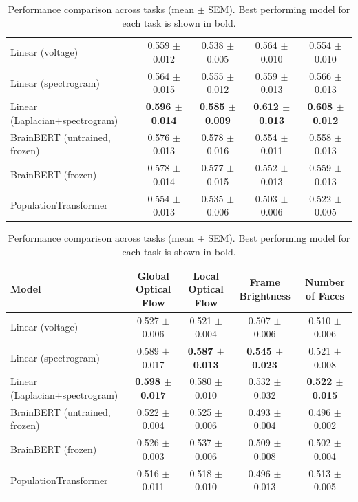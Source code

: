 \begin{table}[h]
\begin{tabular}{lcccc}
\hline
Linear (voltage) & 0.559 $\pm$ 0.012 & 0.538 $\pm$ 0.005 & 0.564 $\pm$ 0.010 & 0.554 $\pm$ 0.010 \\
Linear (spectrogram) & 0.564 $\pm$ 0.015 & 0.555 $\pm$ 0.012 & 0.559 $\pm$ 0.013 & 0.566 $\pm$ 0.013 \\
Linear (Laplacian+spectrogram) & \textbf{0.596 $\pm$ 0.014} & \textbf{0.585 $\pm$ 0.009} & \textbf{0.612 $\pm$ 0.013} & \textbf{0.608 $\pm$ 0.012} \\
BrainBERT (untrained, frozen) & 0.576 $\pm$ 0.013 & 0.578 $\pm$ 0.016 & 0.554 $\pm$ 0.011 & 0.558 $\pm$ 0.013 \\
BrainBERT (frozen) & 0.578 $\pm$ 0.014 & 0.577 $\pm$ 0.015 & 0.552 $\pm$ 0.013 & 0.559 $\pm$ 0.013 \\
PopulationTransformer & 0.554 $\pm$ 0.013 & 0.535 $\pm$ 0.006 & 0.503 $\pm$ 0.006 & 0.522 $\pm$ 0.005 \\
\hline
\end{tabular}
\hspace{1em}
\begin{tabular}{lcccc}
\hline
Model & Global Optical Flow & Local Optical Flow & Frame Brightness & Number of Faces \\
\hline
Linear (voltage) & 0.527 $\pm$ 0.006 & 0.521 $\pm$ 0.004 & 0.507 $\pm$ 0.006 & 0.510 $\pm$ 0.006 \\
Linear (spectrogram) & 0.589 $\pm$ 0.017 & \textbf{0.587 $\pm$ 0.013} & \textbf{0.545 $\pm$ 0.023} & 0.521 $\pm$ 0.008 \\
Linear (Laplacian+spectrogram) & \textbf{0.598 $\pm$ 0.017} & 0.580 $\pm$ 0.010 & 0.532 $\pm$ 0.032 & \textbf{0.522 $\pm$ 0.015} \\
BrainBERT (untrained, frozen) & 0.522 $\pm$ 0.004 & 0.525 $\pm$ 0.006 & 0.493 $\pm$ 0.004 & 0.496 $\pm$ 0.002 \\
BrainBERT (frozen) & 0.526 $\pm$ 0.003 & 0.537 $\pm$ 0.006 & 0.509 $\pm$ 0.008 & 0.502 $\pm$ 0.004 \\
PopulationTransformer & 0.516 $\pm$ 0.011 & 0.518 $\pm$ 0.010 & 0.496 $\pm$ 0.013 & 0.513 $\pm$ 0.005 \\
\hline
\end{tabular}
\caption{Performance comparison across tasks (mean $\pm$ SEM). Best performing model for each task is shown in bold.}
\label{tab:performance_comparison}
\end{table}